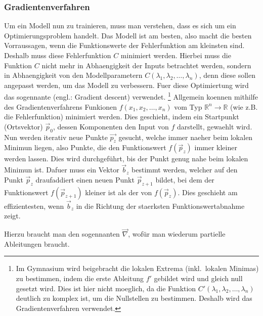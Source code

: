 \documentclass[../main]{subfiles}
\begin{document}
\subsubsection{Gradientenverfahren}
Um ein Modell nun zu trainieren, muss man verstehen, dass es sich um ein Optimierungsproblem handelt.
Das Modell ist am besten, also macht die besten Vorraussagen, wenn die
Funktionswerte der Fehlerfunktion am kleinsten sind.
Deshalb muss diese Fehlerfunktion $C$ minimiert werden.
Hierbei muss die Funktion $C$ nicht mehr in Abhaengigkeit der Inputs betrachtet werden, sondern in Abhaengigkeit von den Modellparametern
$C(\lambda_1, \lambda_2, \ldots, \lambda_n)$, denn diese sollen angepasst werden, um das Modell zu verbessern.
Fuer diese Optimiertung wird das sogennante  (engl.: Gradient descent) verwendet.
\footnote{
  Im Gymnasium wird beigebracht die lokalen Extrema (inkl.\ lokalen Minimas) zu bestimmen, indem die erste Ableitung $f'$ gebildet wird und  gleich null gesetzt wird.
  Dies ist hier nicht moeglich, da die Funktion $C'(\lambda_1,\lambda_2, \ldots, \lambda_n)$ deutlich zu komplex ist, um die Nullstellen zu bestimmen. Deshalb wird das Gradientenverfahren verwendet.
}
\para
Allgemein koennen mithilfe des Gradientenverfahrens Funkionen $f(x_1, x_2, \ldots, x_n)$ vom Typ $\mathbb{R}^n \to \mathbb{R}$ (wie z.B. die Fehlerfunktion) minimiert werden.
Dies geschieht, indem ein Startpunkt (Ortsvektor) $\vec{p}_0$, dessen Komponenten den Input von $f$ darstellt, gewaehlt wird.
Nun werden iterativ neue Punkte $\vec{p_z}$ gesucht, welche immer naeher beim lokalen Minimun liegen, also Punkte, die den Funktionswert $f(\vec{p}_z)$ immer kleiner werden lassen.
Dies wird durchgeführt, bis der Punkt genug nahe beim lokalen Minimun ist.
\para
Dafuer muss ein Vektor $\vec{b}_z$ bestimmt werden, welcher auf den Punkt $\vec{p}_z$ draufaddiert einen neuen Punkt $\vec{p}_{z+1}$ bildet,
bei dem der Funktionswert $f(\vec{p}_{z+1})$ kleiner ist als der von $f(\vec{p}_z)$.
Dies geschieht am effizientesten, wenn $\vec{b}_z$ in die Richtung der staerksten Funktionswertabnahme zeigt.

Hierzu braucht man den sogennanten  $\vec{\nabla}$, wofür man wiederum partielle Ableitungen braucht.
\para
\end{document}
